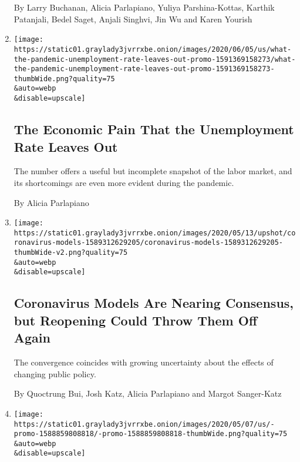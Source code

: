 \begin{enumerate}
  By Larry Buchanan, Alicia Parlapiano, Yuliya Parshina-Kottas, Karthik
  Patanjali, Bedel Saget, Anjali Singhvi, Jin Wu and Karen Yourish
\item
  \href{/interactive/2020/06/05/upshot/what-the-pandemic-unemployment-rate-leaves-out.html}{}

  \texttt{[image: https://static01.graylady3jvrrxbe.onion/images/2020/06/05/us/what-the-pandemic-unemployment-rate-leaves-out-promo-1591369158273/what-the-pandemic-unemployment-rate-leaves-out-promo-1591369158273-thumbWide.png?quality=75\\\&auto=webp\\\&disable=upscale]}

  \hypertarget{the-economic-pain-that-the-unemployment-rate-leaves-out}{%
  \subsection{The Economic Pain That the Unemployment Rate Leaves
  Out}\label{the-economic-pain-that-the-unemployment-rate-leaves-out}}

  The number offers a useful but incomplete snapshot of the labor
  market, and its shortcomings are even more evident during the
  pandemic.

  By Alicia Parlapiano
\item
  \href{/interactive/2020/05/12/upshot/coronavirus-models.html}{}

  \texttt{[image: https://static01.graylady3jvrrxbe.onion/images/2020/05/13/upshot/coronavirus-models-1589312629205/coronavirus-models-1589312629205-thumbWide-v2.png?quality=75\\\&auto=webp\\\&disable=upscale]}

  \hypertarget{coronavirus-models-are-nearing-consensus-but-reopening-could-throw-them-off-again}{%
  \subsection{Coronavirus Models Are Nearing Consensus, but Reopening
  Could Throw Them Off
  Again}\label{coronavirus-models-are-nearing-consensus-but-reopening-could-throw-them-off-again}}

  The convergence coincides with growing uncertainty about the effects
  of changing public policy.

  By Quoctrung Bui, Josh Katz, Alicia Parlapiano and Margot Sanger-Katz
\item
  \href{/2020/05/07/upshot/pandemic-economy-government-orders.html}{}

  \texttt{[image: https://static01.graylady3jvrrxbe.onion/images/2020/05/07/us/-promo-1588859808818/-promo-1588859808818-thumbWide.png?quality=75\\\&auto=webp\\\&disable=upscale]}


\end{enumerate}
